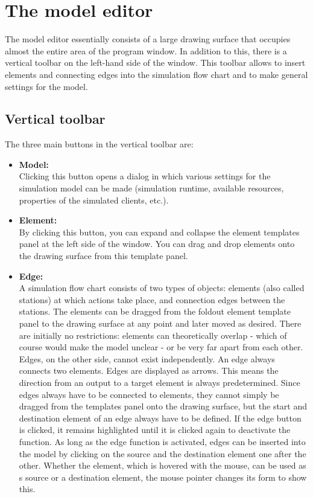 \documentclass{svmono}
\begin{document}
\chapter{The model editor}

The model editor essentially consists of a large drawing surface that occupies almost the entire area of the program window. In addition to this, there is a vertical toolbar on the left-hand side of the window. This toolbar allows to insert elements and connecting edges into the simulation flow chart and to make general settings for the model.

\section{Vertical toolbar}

The three main buttons in the vertical toolbar are:

\begin{itemize}
\item
\textbf{Model:}\\
Clicking this button opens a dialog in which various settings for the simulation model can be made (simulation runtime, available resources, properties of the simulated clients, etc.).
\item
\textbf{Element:}\\
By clicking this button, you can expand and collapse the element templates panel at the left side of the window. You can drag and drop elements onto the drawing surface from this template panel.
\item
\textbf{Edge:}\\
A simulation flow chart consists of two types of objects: elements (also called stations) at which actions take place, and connection edges between the stations. The elements can be dragged from the foldout element template panel to the drawing surface at any point and later moved as desired. There are initially no restrictions: elements can theoretically overlap - which of course would make the model unclear - or be very far apart from each other. Edges, on the other side, cannot exist independently. An edge always connects two elements. Edges are displayed as arrows. This means the direction from an output to a target element is always predetermined. Since edges always have to be connected to elements, they cannot simply be dragged from the templates panel onto the drawing surface, but the start and destination element of an edge always have to be defined. If the edge button is clicked, it remains highlighted until it is clicked again to deactivate the function. As long as the edge function is activated, edges can be inserted into the model by clicking on the source and the destination element one after the other. Whether the element, which is hovered with the mouse, can be used as s source or a destination element, the mouse pointer changes its form to show this.

\end{itemize}
\end{document}
